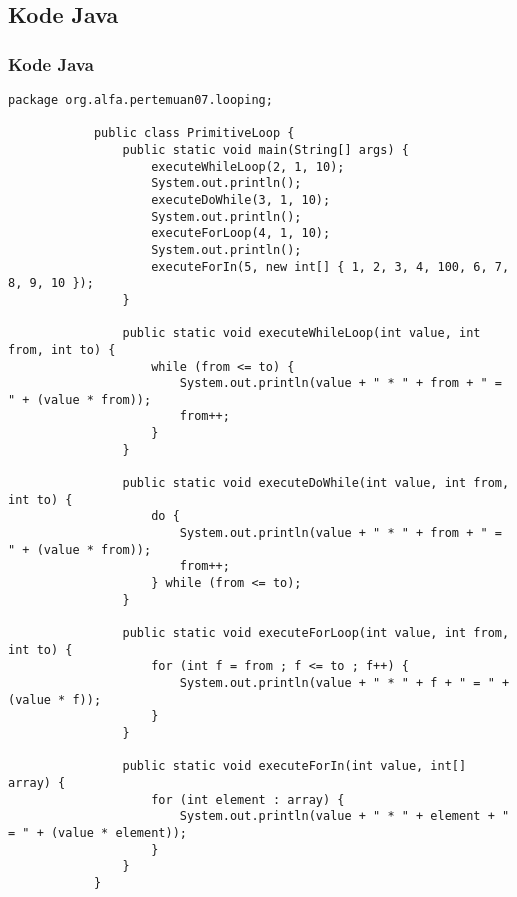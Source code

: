 \documentclass[aspectratio=169, table]{beamer}
\begin{document}
	\subsection{Kode Java}
	\begin{frame}[fragile]
		\frametitle{Kode Java}
		\begin{lstlisting}[style=JavaStyle]
			package org.alfa.pertemuan07.looping;
			
			public class PrimitiveLoop {
				public static void main(String[] args) {
					executeWhileLoop(2, 1, 10);
					System.out.println();
					executeDoWhile(3, 1, 10);
					System.out.println();
					executeForLoop(4, 1, 10);
					System.out.println();
					executeForIn(5, new int[] { 1, 2, 3, 4, 100, 6, 7, 8, 9, 10 });
				}
				
				public static void executeWhileLoop(int value, int from, int to) {
					while (from <= to) {
						System.out.println(value + " * " + from + " = " + (value * from));
						from++;
					}
				}
				
				public static void executeDoWhile(int value, int from, int to) {
					do {
						System.out.println(value + " * " + from + " = " + (value * from));
						from++;
					} while (from <= to);
				}
				
				public static void executeForLoop(int value, int from, int to) {
					for (int f = from ; f <= to ; f++) {
						System.out.println(value + " * " + f + " = " + (value * f));
					}
				}
				
				public static void executeForIn(int value, int[] array) {
					for (int element : array) {
						System.out.println(value + " * " + element + " = " + (value * element));
					}
				}
			}
		\end{lstlisting}
	\end{frame}
	
\end{document}
